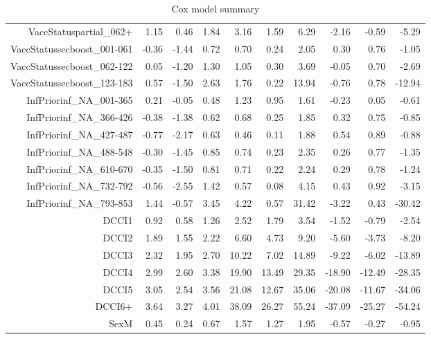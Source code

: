 \begin{table}[ht]
\begin{tabular}{rrrrrrrrrr}
  VaccStatuspartial\_062+ & 1.15 & 0.46 & 1.84 & 3.16 & 1.59 & 6.29 & -2.16 & -0.59 & -5.29 \\ 
  VaccStatussecboost\_001-061 & -0.36 & -1.44 & 0.72 & 0.70 & 0.24 & 2.05 & 0.30 & 0.76 & -1.05 \\ 
  VaccStatussecboost\_062-122 & 0.05 & -1.20 & 1.30 & 1.05 & 0.30 & 3.69 & -0.05 & 0.70 & -2.69 \\ 
  VaccStatussecboost\_123-183 & 0.57 & -1.50 & 2.63 & 1.76 & 0.22 & 13.94 & -0.76 & 0.78 & -12.94 \\ 
  InfPriorinf\_NA\_001-365 & 0.21 & -0.05 & 0.48 & 1.23 & 0.95 & 1.61 & -0.23 & 0.05 & -0.61 \\ 
  InfPriorinf\_NA\_366-426 & -0.38 & -1.38 & 0.62 & 0.68 & 0.25 & 1.85 & 0.32 & 0.75 & -0.85 \\ 
  InfPriorinf\_NA\_427-487 & -0.77 & -2.17 & 0.63 & 0.46 & 0.11 & 1.88 & 0.54 & 0.89 & -0.88 \\ 
  InfPriorinf\_NA\_488-548 & -0.30 & -1.45 & 0.85 & 0.74 & 0.23 & 2.35 & 0.26 & 0.77 & -1.35 \\ 
  InfPriorinf\_NA\_610-670 & -0.35 & -1.50 & 0.81 & 0.71 & 0.22 & 2.24 & 0.29 & 0.78 & -1.24 \\ 
  InfPriorinf\_NA\_732-792 & -0.56 & -2.55 & 1.42 & 0.57 & 0.08 & 4.15 & 0.43 & 0.92 & -3.15 \\ 
  InfPriorinf\_NA\_793-853 & 1.44 & -0.57 & 3.45 & 4.22 & 0.57 & 31.42 & -3.22 & 0.43 & -30.42 \\ 
  DCCI1 & 0.92 & 0.58 & 1.26 & 2.52 & 1.79 & 3.54 & -1.52 & -0.79 & -2.54 \\ 
  DCCI2 & 1.89 & 1.55 & 2.22 & 6.60 & 4.73 & 9.20 & -5.60 & -3.73 & -8.20 \\ 
  DCCI3 & 2.32 & 1.95 & 2.70 & 10.22 & 7.02 & 14.89 & -9.22 & -6.02 & -13.89 \\ 
  DCCI4 & 2.99 & 2.60 & 3.38 & 19.90 & 13.49 & 29.35 & -18.90 & -12.49 & -28.35 \\ 
  DCCI5 & 3.05 & 2.54 & 3.56 & 21.08 & 12.67 & 35.06 & -20.08 & -11.67 & -34.06 \\ 
  DCCI6+ & 3.64 & 3.27 & 4.01 & 38.09 & 26.27 & 55.24 & -37.09 & -25.27 & -54.24 \\ 
  SexM & 0.45 & 0.24 & 0.67 & 1.57 & 1.27 & 1.95 & -0.57 & -0.27 & -0.95 \\ 
   \hline
\end{tabular}
\caption{Cox model summary} 
\end{table}
